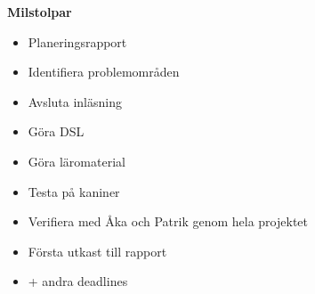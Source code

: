 \documentclass[12pt,a4paper]{article}
\begin{document}
\textbf{Milstolpar}

\begin{itemize}
    \item Planeringsrapport
    \item Identifiera problemområden
    \item Avsluta inläsning
    \item Göra DSL
    \item Göra läromaterial
    \item Testa på kaniner
    \item Verifiera med  Åka och Patrik genom hela projektet
    \item Första utkast till rapport
    \item + andra deadlines
\end{itemize}
\end{document}
